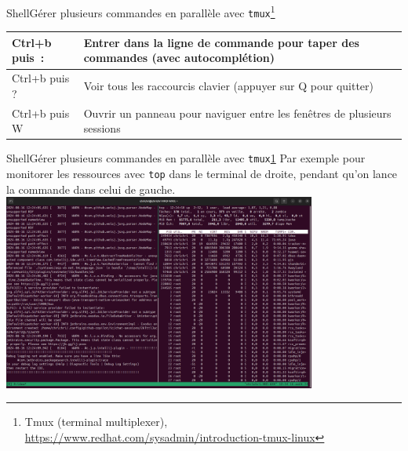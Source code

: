 \documentclass{beamer}
\begin{document}
\begin{frame}{Shell}{Gérer plusieurs commandes en parallèle avec \lstinline{tmux}\footnote{\label{tmux}Tmux (terminal multiplexer), \url{https://www.redhat.com/sysadmin/introduction-tmux-linux}}}
\begin{footnotesize}
\begin{table}[ht]
\begin{tabular}{|p{3.5cm}|p{8cm}|}
                    \hline
                    Ctrl+b puis~:                                         & Entrer dans la ligne de commande pour taper des commandes (avec autocomplétion) \\
                    \hline
                    Ctrl+b puis ?                                         & Voir tous les raccourcis clavier (appuyer sur Q pour quitter)                   \\
                    \hline
                    Ctrl+b puis W                                         & Ouvrir un panneau pour naviguer entre les fenêtres de plusieurs sessions        \\
                    \hline
                \end{tabular}
            \end{table}
        \end{footnotesize}
    \end{frame}

    \begin{frame}{Shell}{Gérer plusieurs commandes en parallèle avec \lstinline{tmux}\cref{tmux}}
        Par exemple pour monitorer les ressources avec \lstinline{top} dans le terminal de droite, pendant qu'on lance la commande dans celui de gauche.
        \bigbreak
        \centering
        \includegraphics[width=10.3cm]{image/tmux-illustration}
    \end{frame}
\end{document}
